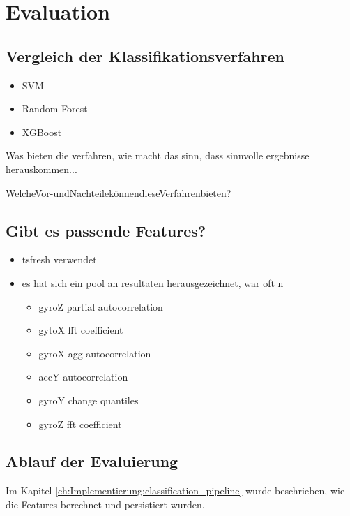 
\chapter{Evaluation}
\label{ch:Evaluation}

\section{Vergleich der Klassifikationsverfahren}
\begin{itemize}
    \item SVM
    \item Random Forest
    \item XGBoost
\end{itemize}

Was bieten die verfahren, wie macht das sinn, dass sinnvolle ergebnisse herauskommen...

WelcheVor-undNachteilekönnendieseVerfahrenbieten?

\section{Gibt es passende Features?}
\begin{itemize}
    \item tsfresh verwendet
    \item es hat sich ein pool an resultaten herausgezeichnet, war oft n 
    \begin{itemize}
        \item gyroZ partial autocorrelation
        \item gytoX fft coefficient
        \item gyroX agg autocorrelation
        \item accY autocorrelation
        \item gyroY change quantiles 
        \item gyroZ fft coefficient
    \end{itemize}
\end{itemize}

\section{Ablauf der Evaluierung}
Im Kapitel \ref{ch:Implementierung:classification_pipeline} wurde beschrieben, wie die Features berechnet und persistiert wurden. 

